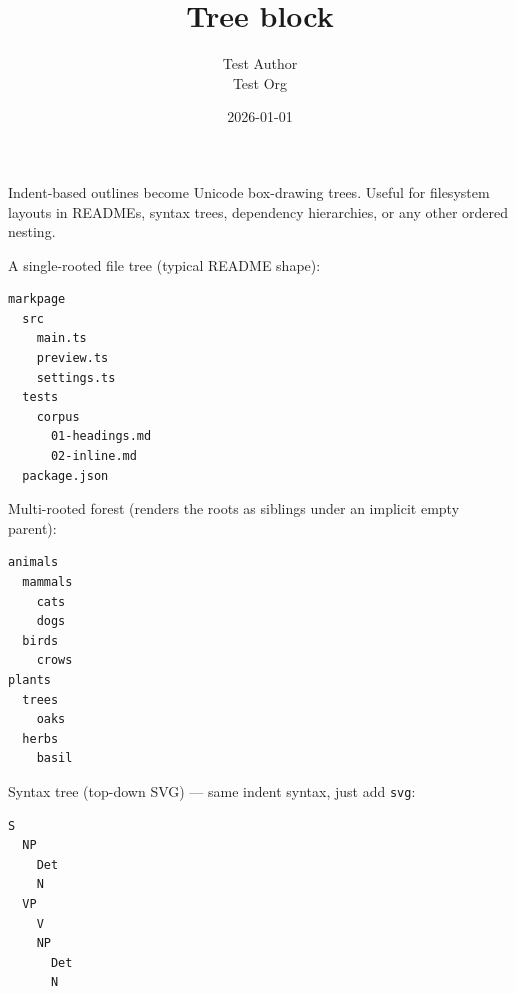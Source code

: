 \documentclass[11pt,a4paper]{article}
\title{Tree block}
\author{Test Author \\ Test Org}
\date{2026-01-01}
\theoremstyle{definition}
\begin{document}
\maketitle

Indent-based outlines become Unicode box-drawing trees. Useful
for filesystem layouts in READMEs, syntax trees, dependency
hierarchies, or any other ordered nesting.


A single-rooted file tree (typical README shape):


\begin{lstlisting}
markpage
  src
    main.ts
    preview.ts
    settings.ts
  tests
    corpus
      01-headings.md
      02-inline.md
  package.json
\end{lstlisting}


Multi-rooted forest (renders the roots as siblings under an
implicit empty parent):


\begin{lstlisting}
animals
  mammals
    cats
    dogs
  birds
    crows
plants
  trees
    oaks
  herbs
    basil
\end{lstlisting}


Syntax tree (top-down SVG) — same indent syntax, just add \texttt{svg}:


\begin{lstlisting}
S
  NP
    Det
    N
  VP
    V
    NP
      Det
      N
\end{lstlisting}
\end{document}
